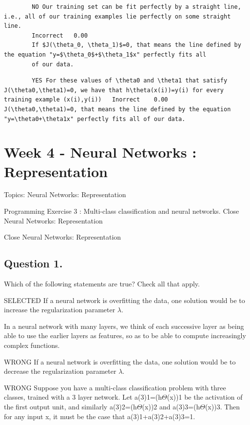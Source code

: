 \documentclass[11pt]{article} %
\begin{document}
		\begin{verbatim}
		NO Our training set can be fit perfectly by a straight line, i.e., all of our training examples lie perfectly on some straight line.	
		Incorrect	0.00	
		If $J(\theta_0, \theta_1)$=0, that means the line defined by the equation "y=$\theta_0$+$\theta_1$x" perfectly fits all
		of our data.
		\end{verbatim}
		
		\begin{verbatim}
		YES For these values of \theta0 and \theta1 that satisfy J(\theta0,\theta1)=0, we have that h\theta(x(i))=y(i) for every training example (x(i),y(i))	Inorrect	0.00	J(\theta0,\theta1)=0, that means the line defined by the equation "y=\theta0+\theta1x" perfectly fits all of our data.
		\end{verbatim}
		\newpage
	\section{Week 4 - Neural Networks : Representation}
	
	
	Topics: Neural Networks: Representation
	
	Programming Exercise 3 : Multi-class classification and neural networks.
	Close
	Neural Networks: Representation
	
Close
Neural Networks: Representation

\subsection*{Question 1. }
Which of the following statements are true? Check all that apply.

SELECTED If a neural network is overfitting the data, one solution would be to increase the regularization parameter $\lambda$.

In a neural network with many layers, we think of each successive layer as being able to use the earlier layers as features, so as to be able to compute increasingly complex functions.

WRONG If a neural network is overfitting the data, one solution would be to decrease the regularization parameter $\lambda$.

WRONG Suppose you have a multi-class classification problem with three classes, trained with a 3 layer network. Let a(3)1=(h$\Theta$(x))1 be the activation of the first output unit, and similarly a(3)2=(h$\Theta$(x))2 and a(3)3=(h$\Theta$(x))3. Then for any input x, it must be the case that a(3)1+a(3)2+a(3)3=1.
\end{document}
